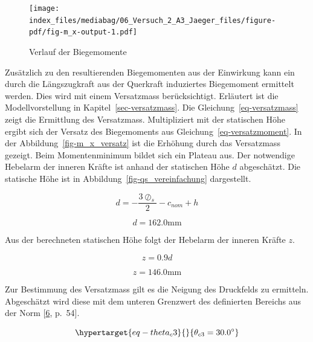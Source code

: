 \documentclass[
  12pt,
  letterpaper,
  egregdoesnotlikesansseriftitles]{scrreprt}
\begin{document}
\begin{figure}[H]

{\centering \texttt{[image: index\_files/mediabag/06\_Versuch\_2\_A3\_Jaeger\_files/figure-pdf/fig-m\_x-output-1.pdf]}

}

\caption{\label{fig-m_x}Verlauf der Biegemomente}

\end{figure}

Zusätzlich zu den resultierenden Biegemomenten aus der Einwirkung kann
ein durch die Längszugkraft aus der Querkraft induziertes Biegemoment
ermittelt werden. Dies wird mit einem Versatzmass berücksichtigt.
Erläutert ist die Modellvorstellung in Kapitel~\ref{sec-versatzmass}.
Die Gleichung~\ref{eq-versatzmass} zeigt die Ermittlung des Versatzmass.
Multipliziert mit der statischen Höhe ergibt sich der Versatz des
Biegemoments aus Gleichung~\ref{eq-versatzmoment}. In der
Abbildung~\ref{fig-m_x_versatz} ist die Erhöhung durch das Versatzmass
gezeigt. Beim Momentenminimum bildet sich ein Plateau aus. Der
notwendige Hebelarm der inneren Kräfte ist anhand der statischen Höhe
\(d\) abgeschätzt. Die statische Höhe ist in
Abbildung~\ref{fig-qs_vereinfachung} dargestellt.

\begin{equation}d = - \frac{3 \oslash_{s}}{2} - c_{nom} + h\end{equation}

\begin{equation}d = 162.0 \text{mm}\end{equation}

Aus der berechneten statischen Höhe folgt der Hebelarm der inneren
Kräfte \(z\).

\begin{equation}z = 0.9 d\end{equation}

\begin{equation}z = 146.0 \text{mm}\end{equation}

Zur Bestimmung des Versatzmass gilt es die Neigung des Druckfelds zu
ermitteln. Abgeschätzt wird diese mit dem unteren Grenzwert des
definierten Bereichs aus der Norm
{[}\protect\hyperlink{ref-SIA2013a}{6}, p.~54{]}.

\begin{equation}\protect\hypertarget{eq-theta_c3}{}{
 \theta_{c3} = 30.0^{\circ} 
}\label{eq-theta_c3}\end{equation}
\end{document}
